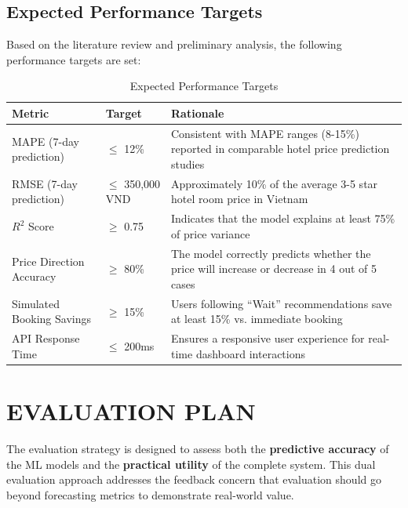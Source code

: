 \documentclass[12pt,a4paper]{report}
\begin{document}
\section{Expected Performance Targets}

Based on the literature review and preliminary analysis, the following performance targets are set:

\begin{table}[H]
\centering
\caption{Expected Performance Targets}
\label{tab:expected_performance}
\begin{tabular}{|p{4.8cm}|p{3cm}|p{7cm}|}
\hline
\textbf{Metric} & \textbf{Target} & \textbf{Rationale} \\
\hline
MAPE (7-day prediction) & $\leq$ 12\% & Consistent with MAPE ranges (8-15\%) reported in comparable hotel price prediction studies \cite{law2019, zhang2011} \\
\hline
RMSE (7-day prediction) & $\leq$ 350,000 VND & Approximately 10\% of the average 3-5 star hotel room price in Vietnam \\
\hline
$R^2$ Score & $\geq$ 0.75 & Indicates that the model explains at least 75\% of price variance \\
\hline
Price Direction Accuracy & $\geq$ 80\% & The model correctly predicts whether the price will increase or decrease in 4 out of 5 cases \\
\hline
Simulated Booking Savings & $\geq$ 15\% & Users following ``Wait'' recommendations save at least 15\% vs. immediate booking \\
\hline
API Response Time & $\leq$ 200ms & Ensures a responsive user experience for real-time dashboard interactions \\
\hline
\end{tabular}
\end{table}


\chapter{EVALUATION PLAN}

The evaluation strategy is designed to assess both the \textbf{predictive accuracy} of the ML models and the \textbf{practical utility} of the complete system. This dual evaluation approach addresses the feedback concern that evaluation should go beyond forecasting metrics to demonstrate real-world value.
\end{document}
